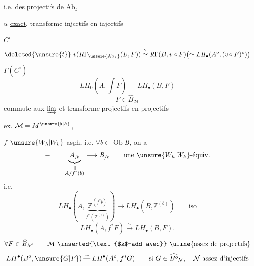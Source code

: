 i.e. des \uline{projectifs} de $\mathrm{Ab}_k$

$u$ \uline{exact}, transforme injectifs en injectifs

$C^i$
\[
\deleted{\unsure{t}}\ v(R\Gamma_{\unsure{\mathrm{Ab}_k}}(B,F))
\overset{?}{\simeq}R\Gamma(B,v\circ F)
\bigl(\simeq LH_\bullet(A^o,(v\circ F)^o)\bigr)
\]
$\Gamma(C^i)$
\[
LH_0(A,\int F)\mathbin{\text{---}}LH_\bullet(B,F)
\]
\[
F\in\widehat B_{\mathcal M}
\]
commute aux $\varinjlim$ et transforme projectifs en projectifs

\uline{ex.} $\mathcal M=M^{\unsure{\flat|h}}$,

$f$ $\unsure{W_h|W_k}$-asph, i.e. $\forall b\in\operatorname{Ob}B$, on a
\[
-\qquad \underbrace{A_{/b}}_{\displaystyle\substack{\Vert\\ A/f^*(b)}}\longrightarrow B_{/b}
\qquad\text{une }\unsure{W_h|W_k}\text{-équiv.}
\]
i.e.
\[
LH_\bullet\left(A,\underbrace{\mathbb Z^{(f^*b)}}_{f^*(\mathbb Z^{(b)})}\right)
\longrightarrow LH_\bullet(B,\mathbb Z^{(b)})\qquad\text{iso}
\]
\[
LH_\bullet(A,f^*F)\xrightarrow{\simeq}LH_\bullet(B,F).
\]
\[
\forall F\in\widehat B_{\mathcal M}\qquad
\mathcal M\ \inserted{\text{$k$-add avec}}\ \text{\uline{assez de projectifs}}
\]
\[
LH^\bullet(B^o,\unsure{G|F})\overset{\simeq}{\mathbin{\text{---}}}LH^\bullet(A^o,f^*G)
\qquad\text{si }G\in\widehat{B^o}_{\mathcal N},\quad\mathcal N\text{ assez d'injectifs}
\]

